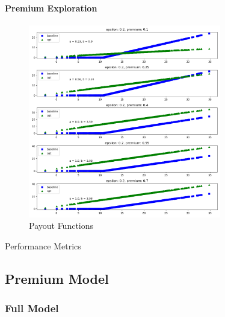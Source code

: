 \documentclass[11pt]{article}
\begin{document}
            \paragraph*{Premium Exploration}
                \begin{figure}[H]
                    \centering
                    \caption{Payout Functions}
                    \includegraphics[width=0.75\textwidth]{../../output/figures/CVaR2/premium_exploration_full.png}
                \end{figure}

                \begin{table}[H]
                    \centering
                    \caption{Performance Metrics}
                    
                \end{table}

                \FloatBarrier

    \subsection*{Premium Model}
        \subsubsection*{Full Model}
\end{document}
